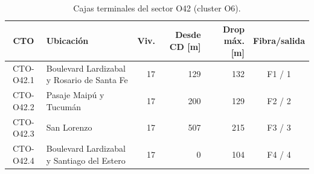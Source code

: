 \begin{table}[H]\centering\footnotesize
\caption{Cajas terminales del sector O42 (cluster O6).}\label{tab:sectorO42}
\begin{tabular}{|c|p{4.0cm}|r|r|r|c|}\hline \textbf{CTO} & \textbf{Ubicación} & \textbf{Viv.} & \textbf{Desde CD [m]} & \textbf{Drop máx. [m]} & \textbf{Fibra/salida} \\ \hline
CTO-O42.1 & Boulevard Lardizabal y Rosario de Santa Fe & 17 & 129 & 132 & F1 / 1 \\ \hline
CTO-O42.2 & Pasaje Maipú y Tucumán & 17 & 200 & 129 & F2 / 2 \\ \hline
CTO-O42.3 & San Lorenzo & 17 & 507 & 215 & F3 / 3 \\ \hline
CTO-O42.4 & Boulevard Lardizabal y Santiago del Estero & 17 & 0 & 104 & F4 / 4 \\ \hline
\end{tabular}\end{table}
